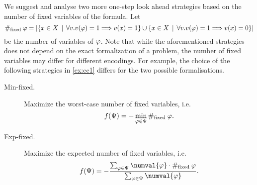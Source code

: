 \newcommand{\fixed}{\#_\textrm{fixed}\:}
We suggest and analyse two more one-step look ahead strategies based on
the number of fixed variables of the formula.
Let
\[
\fixed\form = |\{ x\in\Var \| \forall v.v(\form)=1 ==> v(x)=1 \}
                  \cup\{ x\in\Var \| \forall v.v(\form)=1 ==> v(x)=0 \}|
\]
be the number of variables of $\varphi$.
Note that while the aforementioned strategies does not depend on the exact
  formalization of a problem, the number of fixed variables may differ for
  different encodings.
For example, the choice of the following strategies in \autoref{ex:cc1} differs
  for the two possible formalisations.

\begin{description}
\item[Min-fixed.] Maximize the worst-case number of fixed variables, i.e.
\[
f(\formset) = -\min_{\form\in\formset} \fixed{\form}.
\]
\item[Exp-fixed.] Maximize the expected number of fixed variables, i.e.
\[
f(\formset) = -\frac{\sum_{\form\in\formset}\numval{\form}\cdot\fixed{\form}}{\sum_{\form\in\formset}\numval{\form}}.
\]
\end{description}
\pagebreak

